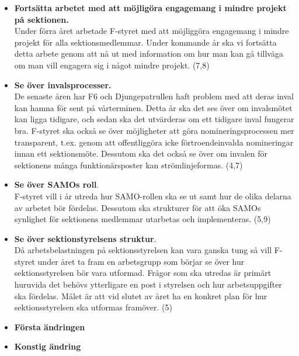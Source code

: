 \documentclass[a4paper]{article}
\begin{document}
\begin{itemize}
\item \textbf{Fortsätta arbetet med att möjligöra engagemang i mindre projekt på sektionen.}\\
Under förra året arbetade F-styret med att möjliggöra engagemang i mindre projekt för alla sektionsmedlemmar. Under kommande år ska vi fortsätta detta arbete genom att nå ut med information om hur man kan gå tillväga om man vill engagera sig i något mindre projekt. (7,8)


\item \textbf{Se över invalsprocesser.} \\
De senaste åren har F6 och Djungepatrullen haft problem med att deras inval kan hamna för sent på vårterminen. Detta år ska det ses över om invalsmötet kan ligga tidigare, och sedan ska det utvärderas om ett tidigare inval fungerar bra. F-styret ska också se över möjligheter att göra nomineringsprocessen mer transparent, t.ex. genom att offentliggöra icke förtroendeinvalda nomineringar innan ett sektionsmöte. Dessutom ska det också se över om invalen för sektionens många funktionärsposter kan strömlinjeformas. (4,7)%

\item \textbf{Se över SAMOs roll}.\\
F-styret vill i år utreda hur SAMO-rollen ska se ut samt hur de olika delarna av arbetet bör fördelas. Dessutom ska strukturer för att öka SAMOs synlighet för sektionens medlemmar utarbetas och implementeras. (5,9) %

\item \textbf{Se över sektionstyrelsens struktur}.\\
Då arbetsbelastningen på sektionsstyrelsen kan vara ganska tung så vill F-styret under året ta fram en arbetsgrupp som börjar se över hur sektionsstyrelsen bör vara utformad. Frågor som ska utredas är primärt huruvida det behövs ytterligare en post i styrelsen och hur arbetsuppgifter ska fördelas. Målet är att vid slutet av året ha en konkret plan för hur sektionsstyrelsen ska utformas framöver. (5)

\item \textbf{Första ändringen}

\item \textbf{Konstig ändring}

\end{itemize}
\end{document}
